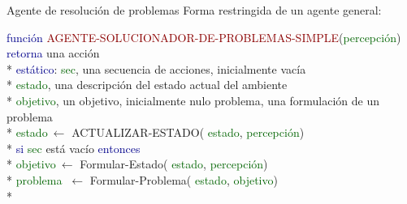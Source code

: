 \documentclass{beamer}
\theoremstyle{definition}
\theoremstyle{theorem}
\theoremstyle{remark}
\begin{document}
\renewcommand{\tablename}{Table}
\renewcommand{\figurename}{\scriptsize Figure}


\begin{frame}
    \titlepage
\end{frame}


\begin{frame}{Agente de resolución de problemas}
    Forma restringida de un agente general:
    
    \begin{theorem}[Pseudocódigo]
        
        \begin{listing}
            {\scriptsize 
                \textcolor{darkblue}{función} \textcolor{darkred}{AGENTE-SOLUCIONADOR-DE-PROBLEMAS-SIMPLE}(\textcolor{darkgreen}{percepción}) 
                \textcolor{darkblue}{retorna} una acción
                \\* \quad\quad
                \textcolor{darkblue}{estático}: 
                \textcolor{darkgreen}{sec}, una secuencia de acciones, inicialmente vacía
                \\* \quad\quad\quad\quad\quad\quad
                \textcolor{darkgreen}{estado}, una descripción del estado actual del ambiente
                \\* \quad\quad\quad\quad\quad\quad
                \textcolor{darkgreen}{objetivo}, un objetivo, inicialmente nulo
                problema, una formulación de un problema
                \\* \quad\quad
                \textcolor{darkgreen}{estado}$\ \leftarrow $ {ACTUALIZAR-ESTADO}(
                \textcolor{darkgreen}{estado}, 
                \textcolor{darkgreen}{percepción})
                \\*\quad\quad
                \textcolor{darkblue}{si} 
                \textcolor{darkgreen}{sec} está vacío 
                \textcolor{darkblue}{entonces} 
                \\*\quad\quad\quad\quad
                \textcolor{darkgreen}{objetivo}$\ \leftarrow $ Formular-Estado(
                \textcolor{darkgreen}{estado}, 
                \textcolor{darkgreen}{percepción})
                \\*\quad\quad\quad\quad
                \textcolor{darkgreen}{problema} $\ \leftarrow $ Formular-Problema(
                \textcolor{darkgreen}{estado}, 
                \textcolor{darkgreen}{objetivo})\\*
}
\end{listing}
\end{theorem}
\end{frame}
\end{document}

